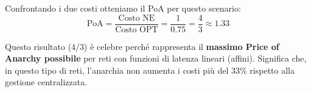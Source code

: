 Confrontando i due costi otteniamo il PoA per questo scenario:
\[
\text{PoA} = \frac{\text{Costo NE}}{\text{Costo OPT}} = \frac{1}{0.75} = \frac{4}{3} \approx 1.33
\]
\begin{osservazione}
Questo risultato ($4/3$) è celebre perché rappresenta il \textbf{massimo Price of Anarchy possibile} per reti con funzioni di latenza lineari (affini). Significa che, in questo tipo di reti, l'anarchia non aumenta i costi più del 33\% rispetto alla gestione centralizzata.
\end{osservazione}
